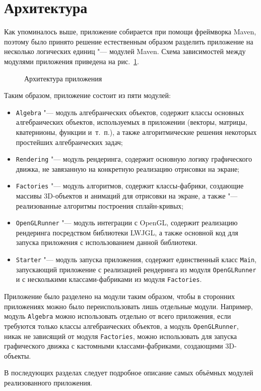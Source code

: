 \section{Архитектура}

Как упоминалось выше, приложение собирается при помощи фреймворка Maven, поэтому было принято решение естественным
образом разделить приложение на несколько логических единиц "--- модулей Maven. Схема зависимостей между модулями
приложения приведена на рис.~\ref{architecture}.

\begin{figure}[h]
\caption{Архитектура приложения}
\label{architecture}
\end{figure}

Таким образом, приложение состоит из пяти модулей:

\begin{itemize}

\item \texttt{Algebra} "--- модуль алгебраических объектов, содержит классы основных алгебраических объектов,
используемых в приложении (векторы, матрицы, кватернионы, функции и~т.~п.), а также алгоритмические решения некоторых
простейших алгебраических задач;
\item \texttt{Rendering} "--- модуль рендеринга, содержит основную логику графического движка, не завязанную
на конкретную реализацию отрисовки на экране;
\item \texttt{Factories} "--- модуль алгоритмов, содержит классы-фабрики, создающие массивы 3D-объектов и анимаций для
отрисовки на экране, а также "--- реализованные алгоритмы построения сплайн-кривых;
\item \texttt{OpenGLRunner} "--- модуль интеграции с OpenGL, содержит реализацию рендеринга посредством библиотеки
LWJGL, а также основной код для запуска приложения с использованием данной библиотеки.
\item \texttt{Starter} "--- модуль запуска приложения, содержит единственный класс \texttt{Main}, запускающий
приложение с реализацией рендеринга из модуля \texttt{OpenGLRunner} и с несколькими классами-фабриками из модуля
\texttt{Factories}.
\end{itemize}

Приложение было разделено на модули таким образом, чтобы в сторонних приложениях
можно было переиспользовать лишь отдельные модули. Например, модуль \texttt{Algebra} можно
использовать отдельно от всего приложения, если требуются только классы алгебраических объектов, а модуль
\texttt{OpenGLRunner}, никак не зависящий от модуля \texttt{Factories}, можно использовать для запуска графического
движка с кастомными классами-фабриками, создающими 3D-объекты.

В последующих разделах следует подробное описание самых объёмных модулей реализованного приложения.
